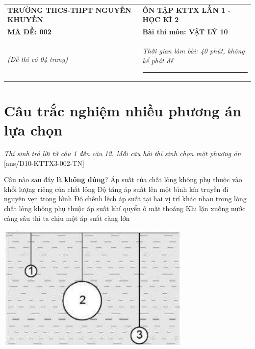 \begin{center}
	\begin{tabular}{M{9.25cm}M{8.75cm}}
		\textbf{TRƯỜNG THCS-THPT NGUYỄN KHUYẾN}& \textbf{ÔN TẬP KTTX LẦN 1 - HỌC KÌ 2}\\
		\textbf{MÃ ĐỀ: 002}& \textbf{Bài thi môn: VẬT LÝ 10}\\
		\textit{(Đề thi có 04 trang)}& \textit{Thời gian làm bài: 40 phút, không kể phát đề}
		
		\noindent\rule{4cm}{0.8pt} \\
	\end{tabular}
\end{center}
\vspace{-0.5cm}
\setcounter{section}{0}
\section{Câu trắc nghiệm nhiều phương án lựa chọn}
\textit{Thí sinh trả lời từ câu 1 đến câu 12. Mỗi câu hỏi thí sinh chọn một phương án}
\setcounter{ex}{0}
[ans/D10-KTTX3-002-TN]
\begin{ex}
	Câu nào sau đây là \textbf{không đúng}?
	\choice
	{\True Áp suất của chất lỏng không phụ thuộc vào khối lượng riêng của chất lỏng}
	{Độ tăng áp suất lên một bình kín truyền đi nguyên vẹn trong bình}
	{Độ chênh lệch áp suất tại hai vị trí khác nhau trong lòng chất lỏng không phụ thuộc áp suất khí quyển ở mặt thoáng}
	{Khi lặn xuống nước càng sâu thì ta chịu một áp suất càng lớn }
	\loigiai{}
\end{ex}
\begin{ex}
	{\includegraphics[scale=0.6]{../figs/D10-KTTX3-002-6}}
	\loigiai{}
\end{ex}
